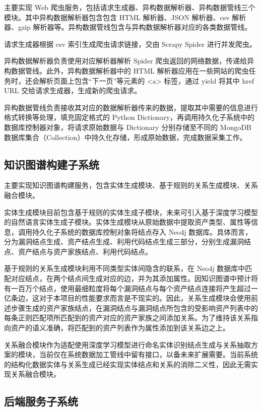 \documentclass[a4paper,AutoFakeBold,oneside,12pt]{book}
\begin{document}
主要实现 Web 爬虫服务，包括请求生成器、异构数据解析器、异构数据管线三个模块。其中异构数据解析器包含包含 HTML 解析器、JSON 解析器、csv 解析器、gzip 解析器等。异构数据管线包含与异构数据解析器对应的各类数据管线。

请求生成器根据 csv 索引生成爬虫请求链接，交由 Scrapy Spider 进行并发爬虫。

异构数据解析器负责使用对应解析器解析 Spider 爬虫返回的网络数据，传递给异构数据管线。此外，异构数据解析器中的 HTML 解析器应用在一些网站的爬虫任务时，还会解析页面上包含“下一页”等元素的 <a> 标签，通过 yield 将其中 href URL 交给请求生成器，生成新的爬虫请求。

异构数据管线负责接收其对应的数据解析器传来的数据，提取其中需要的信息进行格式转换等处理，填充固定格式的 Python Dictionary，再调用持久化子系统中的数据库控制器对象，将请求原始数据与 Dictionary 分别存储至不同的 MongoDB 数据库集合（Collection）中持久化存储，形成原始数据，完成数据采集工作。

\subsection{知识图谱构建子系统}

主要实现知识图谱构建服务，包含实体生成模块、基于规则的关系生成模块、关系融合模块。

实体生成模块目前包含基于规则的实体生成子模块，未来可引入基于深度学习模型的自然语言实体生成子模块。实体生成模块从原始数据中提取资产类型、属性等信息，调用持久化子系统的数据库控制对象将结点存入 Neo4j 数据库。具体而言，分为漏洞结点生成、资产结点生成、利用代码结点生成三部分，分别生成漏洞结点、资产结点与资产家族结点、利用代码结点。

基于规则的关系生成模块利用不同类型实体间隐含的联系，在 Neo4j 数据库中匹配对应结点，在两个结点间生成对应的边，并为其添加属性。因知识图谱中预计将有一百万个结点，使用最细粒度将每个漏洞结点与每个资产结点连接将产生超过一亿条边，这对于本项目的性能要求而言是不现实的。因此，关系生成模块会使用前述步骤生成的资产家族结点，在漏洞结点与漏洞结点所包含的受影响资产列表中的每条正则匹配项所匹配到的资产对应的资产家族之间添加关系。为了维持该关系指向资产的语义准确，将匹配到的资产列表作为属性添加到该关系边之上。

关系融合模块作为适配使用深度学习模型进行命名实体识别结点生成与关系抽取方案的模块，当前仅在系统数据加工管线中留有接口，以备未来扩展需要。当前系统的结构化数据实体与关系生成已经实现实体结点和关系的消除二义性，因此无需实现关系融合模块。

\subsection{后端服务子系统}
\end{document}
